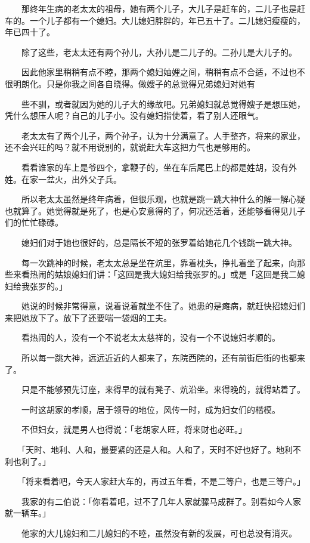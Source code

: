 \documentclass[UTF8]{ctexart}
\begin{document}
　　那终年生病的老太太的祖母，她有两个儿子，大儿子是赶车的，二儿子也是赶车的。一个儿子都有一个媳妇。大儿媳妇胖胖的，年已五十了。二儿媳妇瘦瘦的，年已四十了。

　　除了这些，老太太还有两个孙儿，大孙儿是二儿子的。二孙儿是大儿子的。

　　因此他家里稍稍有点不睦，那两个媳妇妯娌之间，稍稍有点不合适，不过也不很明朗化。只是你我之间各自晓得。做嫂子的总觉得兄弟媳妇对她有

　　些不驯，或者就因为她的儿子大的缘故吧。兄弟媳妇就总觉得嫂子是想压她，凭什么想压人呢？自己的儿子小。没有媳妇指使着，看了别人还眼气。

　　老太太有了两个儿子，两个孙子，认为十分满意了。人手整齐，将来的家业，还不会兴旺的吗？就不用说别的，就说赶大车这把力气也是够用的。

　　看看谁家的车上是爷四个，拿鞭子的，坐在车后尾巴上的都是姓胡，没有外姓。在家一盆火，出外父子兵。

　　所以老太太虽然是终年病着，但很乐观，也就是跳一跳大神什么的解一解心疑也就算了。她觉得就是死了，也是心安意得的了，何况还活着，还能够看得见儿子们的忙忙碌碌。

　　媳妇们对于她也很好的，总是隔长不短的张罗着给她花几个钱跳一跳大神。

　　每一次跳神的时候，老太太总是坐在炕里，靠着枕头，挣扎着坐了起来，向那些来看热闹的姑娘媳妇们讲：「这回是我大媳妇给我张罗的。」或是「这回是我二媳妇给我张罗的。」

　　她说的时候非常得意，说着说着就坐不住了。她患的是瘫病，就赶快招媳妇们来把她放下了。放下了还要喘一袋烟的工夫。

　　看热闹的人，没有一个不说老太太慈祥的，没有一个不说媳妇孝顺的。

　　所以每一跳大神，远远近近的人都来了，东院西院的，还有前街后街的也都来了。

　　只是不能够预先订座，来得早的就有凳子、炕沿坐。来得晚的，就得站着了。

　　一时这胡家的孝顺，居于领导的地位，风传一时，成为妇女们的楷模。

　　不但妇女，就是男人也得说：「老胡家人旺，将来财也必旺。」

　　「天时、地利、人和，最要紧的还是人和。人和了，天时不好也好了。地利不利也利了。」

　　「将来看着吧，今天人家赶大车的，再过五年看，不是二等户，也是三等户。」

　　我家的有二伯说：「你看着吧，过不了几年人家就骡马成群了。别看如今人家就一辆车。」

　　他家的大儿媳妇和二儿媳妇的不睦，虽然没有新的发展，可也总没有消灭。
\end{document}
